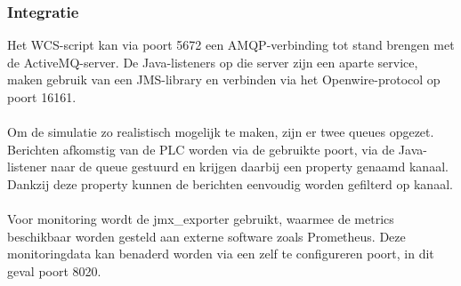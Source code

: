 \subsubsection{Integratie}
Het WCS-script kan via poort 5672 een AMQP-verbinding tot stand brengen met de ActiveMQ-server.
De Java-listeners op die server zijn een aparte service, maken gebruik van een JMS-library en verbinden via het Openwire-protocol op poort 16161.
\\\\
Om de simulatie zo realistisch mogelijk te maken, zijn er twee queues opgezet. 
Berichten afkomstig van de PLC worden via de gebruikte poort, via de Java-listener naar de queue gestuurd en krijgen daarbij een property genaamd kanaal.
Dankzij deze property kunnen de berichten eenvoudig worden gefilterd op kanaal. 
\\\\
Voor monitoring wordt de jmx\_exporter gebruikt, waarmee de metrics beschikbaar worden gesteld aan externe software zoals Prometheus. 
Deze monitoringdata kan benaderd worden via een zelf te configureren poort, in dit geval poort 8020.

